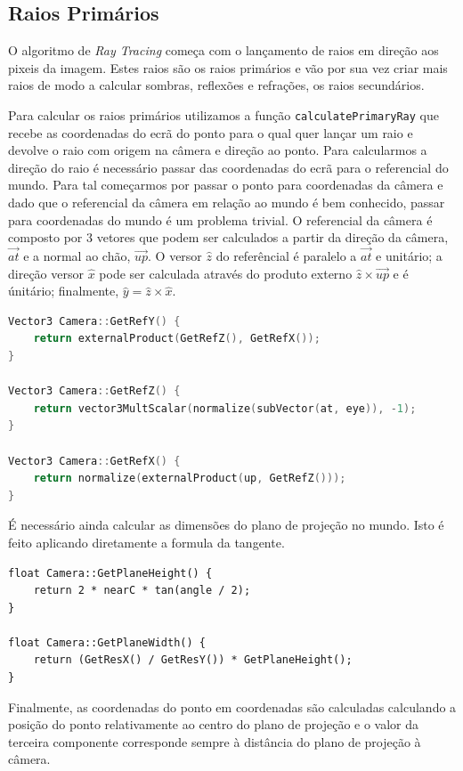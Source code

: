 \documentclass{article}
\begin{document}
\begin{multicols}{2}
    \section{Raios Primários}

    O algoritmo de \textit{Ray Tracing} começa com o lançamento de raios em direção aos pixeis da imagem.
    Estes raios são os raios primários e vão por sua vez criar mais raios de modo a calcular sombras, reflexões
    e refrações, os raios secundários.
    
    Para calcular os raios primários utilizamos a função \verb|calculatePrimaryRay| que recebe as coordenadas
    do ecrã do ponto para o qual quer lançar um raio e devolve o raio com origem na câmera e direção ao ponto.
    Para calcularmos a direção do raio é necessário passar das coordenadas do ecrã para o referencial do mundo.
    Para tal começarmos por passar o ponto para coordenadas da câmera e dado que o referencial da câmera em
    relação ao mundo é bem conhecido, passar para coordenadas do mundo é um problema trivial. O referencial
    da câmera é composto por 3 vetores que podem ser calculados a partir da direção da câmera,
    $\vec{at}$ e a normal ao chão, $\vec{up}$. O versor $\hat{z}$ do referêncial é paralelo a $\vec{at}$ e unitário;
    a direção versor $\hat{x}$ pode ser calculada através do produto externo $\hat{z} \times \vec{up}$ e é únitário;
    finalmente, $\hat{y} = \hat{z} \times \hat{x}$.
    
\begin{lstlisting}[language=C++]
Vector3 Camera::GetRefY() {
	return externalProduct(GetRefZ(), GetRefX());
}

Vector3 Camera::GetRefZ() {
	return vector3MultScalar(normalize(subVector(at, eye)), -1);
}

Vector3 Camera::GetRefX() {
	return normalize(externalProduct(up, GetRefZ()));
}
\end{lstlisting}
    
    É necessário ainda calcular as dimensões do plano de projeção no mundo. Isto é feito aplicando diretamente a
    formula da tangente.
    
\begin{lstlisting}
float Camera::GetPlaneHeight() {
	return 2 * nearC * tan(angle / 2);
}

float Camera::GetPlaneWidth() {
	return (GetResX() / GetResY()) * GetPlaneHeight();
}
\end{lstlisting}

    Finalmente, as coordenadas do ponto em coordenadas são calculadas calculando a posição do ponto relativamente
    ao centro do plano de projeção e o valor da terceira componente corresponde sempre à distância do plano de
    projeção à câmera.
    

\end{multicols}
\end{document}
